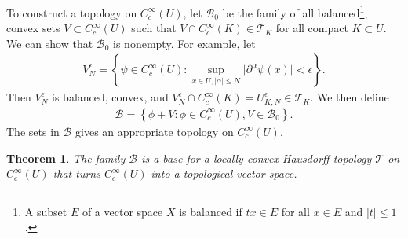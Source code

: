 \documentclass{article}
\numberwithin{equation}{section}
\newcommand{\scr}{\mathscr}
\theoremstyle{plain}
\newtheorem{theorem}{Theorem}[section]
\theoremstyle{definition}
\begin{document}
To construct a topology on $C_c^\infty(U)$, let $\scr{B}_0$ be the family of all balanced\footnote{A subset $E$ of a vector space $X$ is balanced if $tx\in E$ for all $x\in E$ and $\vert t\vert\leq 1$.}, convex sets $V\subset C_c^\infty(U)$ such that $V\cap C_c^\infty(K)\in\scr{T}_K$ for all compact $K\subset U$. We can show that $\scr{B}_0$ is nonempty. For example, let
\begin{align}
	V_N^\epsilon=\left\{\psi\in C_c^\infty(U):\sup_{x\in U,\vert\alpha\vert\leq N}\vert\partial^\alpha\psi(x)\vert<\epsilon\right\}.\label{ccinftyneighborhood}
\end{align}
Then $V_N^\epsilon$ is balanced, convex, and $V_N^\epsilon\cap C_c^\infty(K)=U_{K,N}^\epsilon\in\mathscr{T}_K$. We then define
\begin{align*}
	\mathscr{B}=\left\{\phi+V:\phi\in C_c^\infty(U),V\in\mathscr{B}_0\right\}.
\end{align*}
The sets in $\scr{B}$ gives an appropriate topology on $C_c^\infty(U)$.

\begin{theorem}
The family $\scr{B}$ is a base for a locally convex Hausdorff topology $\scr{T}$ on $C_c^\infty(U)$ that turns $C_c^\infty(U)$ into a topological vector space.
\end{theorem}
\end{document}
